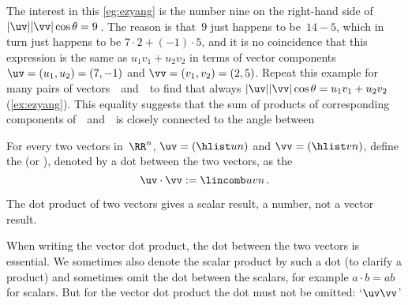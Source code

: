 The interest in this \cref{eg:ezyang} is the number nine on the right-hand side of \(|\uv||\vv|\cos\theta=9\)\,.  
The reason is that~\(9\) just happens to be~\(14-5\), which in turn just happens to be \(7\cdot2+(-1)\cdot5\), and it is no coincidence that this expression is the same as \(u_1v_1+u_2v_2\) in terms of vector components \(\uv=(u_1,u_2)=(7,-1)\) and \(\vv=(v_1,v_2)=(2,5)\).
Repeat this example for many pairs of vectors~\uv\ and~\vv\ to find that always \(|\uv||\vv|\cos\theta=u_1v_1+u_2v_2\) (\cref{ex:ezyang}).
This equality suggests that the sum of products of corresponding components of~\uv\ and~\vv\ is closely connected to the angle between 


\begin{definition} \label{def:dotprod}
For every two vectors in~\(\RR^n\), $\uv=(\hlist un)$ and $\vv=(\hlist vn)$,
define the  (or ), denoted by a dot between the two vectors, as the 
\begin{equation*}
\uv\cdot \vv:= \lincomb uvn\,.
\end{equation*}
\end{definition}

The dot product of two vectors gives a scalar result, a number, not a vector result.

When writing the vector dot product, the dot between the two vectors is essential.
We sometimes also denote the scalar product by such a dot (to clarify a product) and sometimes omit the dot between the scalars, for example \(a\cdot b=ab\) for scalars. 
But for the vector dot product the dot must not be omitted: `\(\uv\vv\)' 


